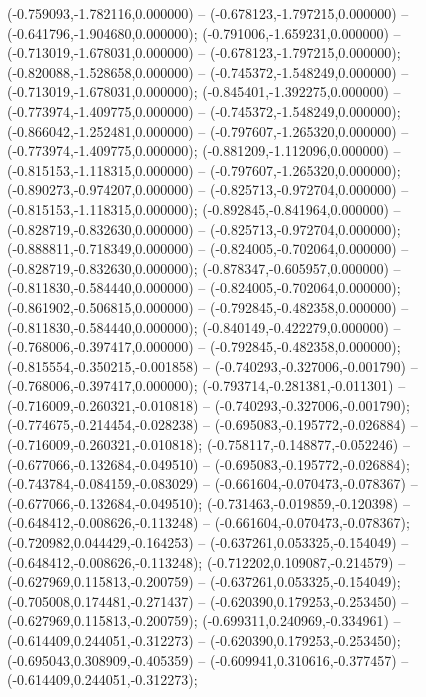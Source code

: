  (-0.759093,-1.782116,0.000000) -- (-0.678123,-1.797215,0.000000) -- (-0.641796,-1.904680,0.000000);
 (-0.791006,-1.659231,0.000000) -- (-0.713019,-1.678031,0.000000) -- (-0.678123,-1.797215,0.000000);
 (-0.820088,-1.528658,0.000000) -- (-0.745372,-1.548249,0.000000) -- (-0.713019,-1.678031,0.000000);
 (-0.845401,-1.392275,0.000000) -- (-0.773974,-1.409775,0.000000) -- (-0.745372,-1.548249,0.000000);
 (-0.866042,-1.252481,0.000000) -- (-0.797607,-1.265320,0.000000) -- (-0.773974,-1.409775,0.000000);
 (-0.881209,-1.112096,0.000000) -- (-0.815153,-1.118315,0.000000) -- (-0.797607,-1.265320,0.000000);
 (-0.890273,-0.974207,0.000000) -- (-0.825713,-0.972704,0.000000) -- (-0.815153,-1.118315,0.000000);
 (-0.892845,-0.841964,0.000000) -- (-0.828719,-0.832630,0.000000) -- (-0.825713,-0.972704,0.000000);
 (-0.888811,-0.718349,0.000000) -- (-0.824005,-0.702064,0.000000) -- (-0.828719,-0.832630,0.000000);
 (-0.878347,-0.605957,0.000000) -- (-0.811830,-0.584440,0.000000) -- (-0.824005,-0.702064,0.000000);
 (-0.861902,-0.506815,0.000000) -- (-0.792845,-0.482358,0.000000) -- (-0.811830,-0.584440,0.000000);
 (-0.840149,-0.422279,0.000000) -- (-0.768006,-0.397417,0.000000) -- (-0.792845,-0.482358,0.000000);
 (-0.815554,-0.350215,-0.001858) -- (-0.740293,-0.327006,-0.001790) -- (-0.768006,-0.397417,0.000000);
 (-0.793714,-0.281381,-0.011301) -- (-0.716009,-0.260321,-0.010818) -- (-0.740293,-0.327006,-0.001790);
 (-0.774675,-0.214454,-0.028238) -- (-0.695083,-0.195772,-0.026884) -- (-0.716009,-0.260321,-0.010818);
 (-0.758117,-0.148877,-0.052246) -- (-0.677066,-0.132684,-0.049510) -- (-0.695083,-0.195772,-0.026884);
 (-0.743784,-0.084159,-0.083029) -- (-0.661604,-0.070473,-0.078367) -- (-0.677066,-0.132684,-0.049510);
 (-0.731463,-0.019859,-0.120398) -- (-0.648412,-0.008626,-0.113248) -- (-0.661604,-0.070473,-0.078367);
 (-0.720982,0.044429,-0.164253) -- (-0.637261,0.053325,-0.154049) -- (-0.648412,-0.008626,-0.113248);
 (-0.712202,0.109087,-0.214579) -- (-0.627969,0.115813,-0.200759) -- (-0.637261,0.053325,-0.154049);
 (-0.705008,0.174481,-0.271437) -- (-0.620390,0.179253,-0.253450) -- (-0.627969,0.115813,-0.200759);
 (-0.699311,0.240969,-0.334961) -- (-0.614409,0.244051,-0.312273) -- (-0.620390,0.179253,-0.253450);
 (-0.695043,0.308909,-0.405359) -- (-0.609941,0.310616,-0.377457) -- (-0.614409,0.244051,-0.312273);
